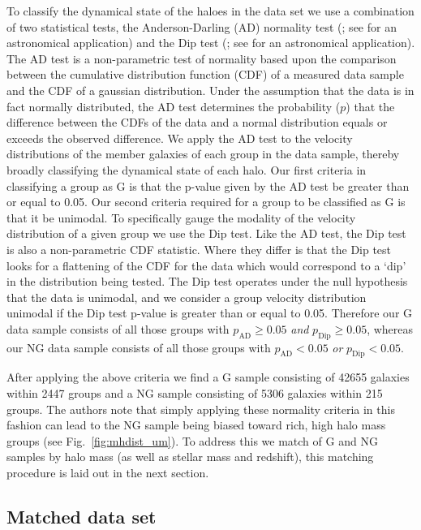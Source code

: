 \documentclass[a4paper,fleqn,usenatbib]{mnras}
\begin{document}
To classify the dynamical state of the haloes in the data set we use a
combination of two statistical tests, the Anderson-Darling (AD)
normality test (\citealt{anderson1952}; see \citealt{hou2009, hou2013}
for an astronomical application) and the Dip test
(\citealt{hartigan1985}; see \citealt{ribeiro2013} for an astronomical
application).  The AD test is a non-parametric test of normality based
upon the comparison between the cumulative distribution function (CDF) of a
measured data sample and the CDF of a gaussian distribution.  Under
the assumption that the data is in fact normally distributed, the AD
test determines the probability ($p$) that the difference between
the CDFs of the data and a normal distribution equals or exceeds the
observed difference.  We apply the AD test to the velocity
distributions of the member galaxies of each group in the data sample,
thereby broadly classifying the dynamical state of each halo.  Our
first criteria in classifying a group as G is that the p-value given
by the AD test be greater than or equal to 0.05.  Our second criteria
required for a
group to be classified as G is that it be unimodal.  To specifically
gauge the modality of the velocity distribution of a given group we
use the Dip test.  Like the AD test, the Dip test is also a
non-parametric CDF statistic.  Where they differ is that the Dip test
looks for a flattening of the CDF for the data which would correspond
to a `dip' in the distribution being tested.  The Dip test operates
under the null hypothesis that the data is unimodal, and we consider a
group velocity distribution unimodal if the Dip test p-value is
greater than or equal to 0.05.  Therefore our G data sample consists
of all those groups with $p_{\text{AD}} \ge 0.05$
\emph{and} $p_{\text{Dip}} \ge 0.05$, whereas our NG data
sample consists of all those groups with $p_{\text{AD}} < 0.05$
\emph{or} $p_{\text{Dip}} < 0.05$.
\par
After applying the above criteria we find a G sample consisting of
42655 galaxies within 2447 groups and a NG sample consisting of 5306
galaxies within 215 groups.  The authors note that simply applying
these normality criteria in this fashion can lead to the NG sample
being biased toward rich, high halo mass groups (see
Fig.~\ref{fig:mhdist_um}).  To address this we
match of G and NG samples by halo mass (as well as stellar mass and
redshift), this matching procedure is laid out in the next section.

\subsection{Matched data set}
\end{document}

